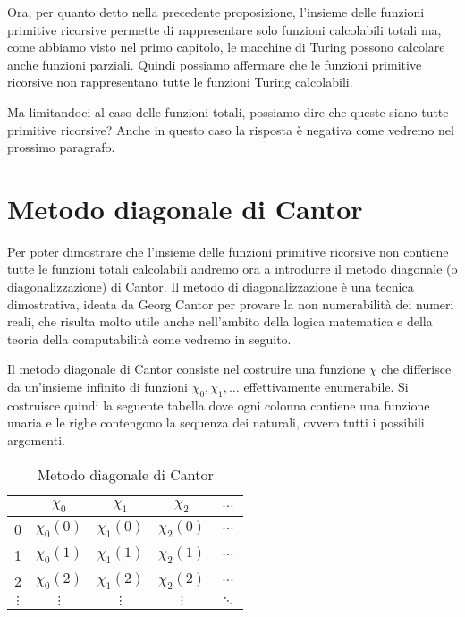 Ora, per quanto detto nella precedente proposizione, l'insieme delle funzioni
primitive ricorsive permette di rappresentare solo funzioni calcolabili totali
ma, come abbiamo visto nel primo capitolo, le macchine di Turing possono
calcolare anche funzioni parziali. Quindi possiamo affermare che le
funzioni primitive ricorsive non rappresentano tutte le funzioni Turing
calcolabili.

Ma limitandoci al caso delle funzioni totali, possiamo dire che queste
siano tutte primitive ricorsive? Anche in questo caso la risposta è
negativa come vedremo nel prossimo paragrafo.

\section{Metodo diagonale di Cantor}
Per poter dimostrare che l'insieme delle funzioni primitive ricorsive
non contiene tutte le funzioni totali calcolabili andremo ora a
introdurre il metodo diagonale (o diagonalizzazione) di Cantor.  Il
metodo di diagonalizzazione è una tecnica dimostrativa, ideata da
Georg Cantor per provare la non numerabilità dei numeri reali, che
risulta molto utile anche nell'ambito della logica matematica e della
teoria della computabilità come vedremo in seguito.

Il metodo diagonale di Cantor consiste nel costruire una funzione $\chi$
che differisce da un'insieme infinito di funzioni $\chi_0,\chi_1,\dots$
effettivamente enumerabile. Si costruisce quindi la seguente tabella
dove ogni colonna contiene una funzione unaria e le righe contengono
la sequenza dei naturali, ovvero tutti i possibili argomenti.
\begin{table}[!h]
\begin{center}
\begin{tabular}{|c|c|c|c|c}

\hline
 & $\chi_0$ & $\chi_1$ & $\chi_2$ & $\ldots$\\
\hline
0 & $\chi_0(0)$ & $\chi_1(0)$  & $\chi_2(0)$  & $\ldots$\\
\hline
1 & $\chi_0(1)$ & $\chi_1(1)$  & $\chi_2(1)$  & $\ldots$\\
\hline
2 &  $\chi_0(2)$ & $\chi_1(2)$  & $\chi_2(2)$  & $\ldots$\\
\hline
$\vdots$ & $\vdots$ &       $\vdots$  & $\vdots$  & $\ddots$\\

\end{tabular}
\end{center}
\caption{Metodo diagonale di Cantor}
\end{table}

